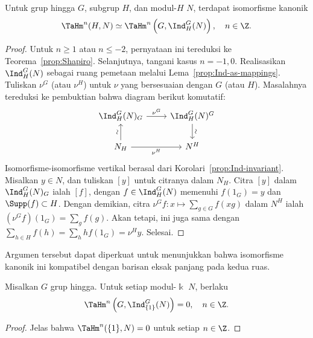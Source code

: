 \begin{proposition}
	Untuk grup hingga $G$, subgrup $H$, dan modul-$H$ $N$, terdapat
	isomorfisme kanonik
	\[ \TaHm^n(H, N) \simeq \TaHm^n\left( G, \Ind^G_H(N)\right), \quad n \in \Z. \]
\end{proposition}

\begin{proof}
	Untuk $n \geq 1$ atau $n \leq -2$, pernyataan ini tereduksi ke
	Teorema~\ref{prop:Shapiro}. Selanjutnya, tangani kasus $n=-1,0$.
	Realisasikan $\Ind^G_H(N)$ sebagai ruang pemetaan melalui
	Lema~\ref{prop:Ind-as-mappings}. Tuliskan $\nu^G$ (atau $\nu^H$) untuk
	$\nu$ yang bersesuaian dengan $G$ (atau $H$). Masalahnya tereduksi ke
	pembuktian bahwa diagram berikut komutatif:
	\[\begin{tikzcd}
		\Ind^G_H(N)_G \arrow[r, "{\nu^G}"] & \Ind^G_H(N)^G \arrow[d, "\sim" sloped] \\
		N_H \arrow[u, "\sim" sloped] \arrow[r, "{\nu^H}"'] & N^H
	\end{tikzcd}\]
	Isomorfisme-isomorfisme vertikal berasal dari
	Korolari~\ref{prop:Ind-invariant}. Misalkan $y\in N$, dan tuliskan $[y]$
	untuk citranya dalam $N_H$. Citra $[y]$ dalam $\Ind^G_H(N)_G$ ialah $[f]$,
	dengan $f\in\Ind^G_H(N)$ memenuhi $f(1_G)=y$ dan
	$\Supp(f)\subset H$. Dengan demikian, citra
	$\nu^Gf:x\mapsto\sum_{g\in G}f(xg)$ dalam $N^H$ ialah
	$(\nu^Gf)(1_G)=\sum_gf(g)$. Akan tetapi, ini juga sama dengan
	$\sum_{h\in H}f(h)=\sum_hhf(1_G)=\nu^Hy$. Selesai.
\end{proof}

Argumen tersebut dapat diperkuat untuk menunjukkan bahwa isomorfisme kanonik
ini kompatibel dengan barisan eksak panjang pada kedua ruas.

\begin{corollary}\label{prop:Tate-ind-vanishing}
	Misalkan $G$ grup hingga. Untuk setiap modul-$\Bbbk$ $N$, berlaku
	\[ \TaHm^n\left(G, \Ind^G_{\{1\}}(N)\right) = 0, \quad n \in \Z. \]
\end{corollary}

\begin{proof}
	Jelas bahwa $\TaHm^n(\{1\},N)=0$ untuk setiap $n\in\Z$.
\end{proof}

